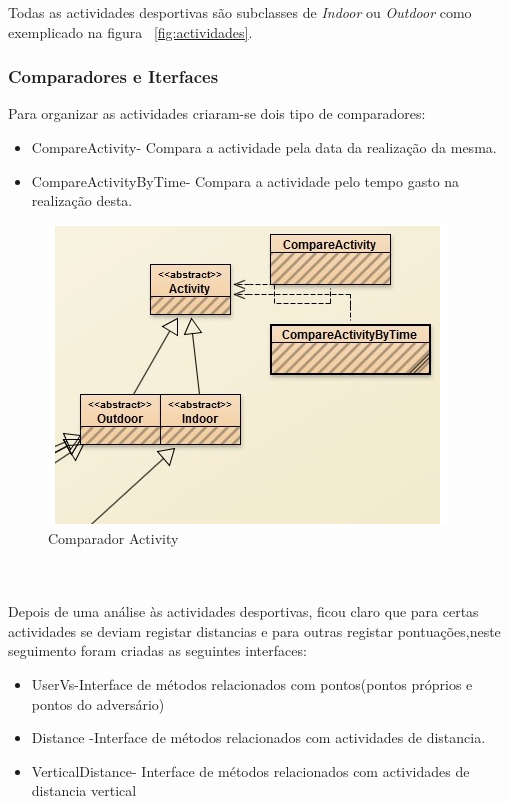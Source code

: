 \documentclass[10pt,notitlepage]{article}
\begin{document}
Todas as actividades desportivas são subclasses de \textit{Indoor} ou \textit{Outdoor} como exemplicado na figura ~\ref{fig:actividades}.
 
\subsubsection{Comparadores e Iterfaces}
Para organizar as actividades criaram-se dois tipo de comparadores:
\begin{itemize}
\item CompareActivity- Compara a actividade pela data da realização da mesma.
\item CompareActivityByTime- Compara a actividade pelo tempo gasto na realização desta.
\end{itemize}

\begin{figure}[ht]
\centering
\includegraphics[scale=1]{ComparadorActivity.png}
\caption{Comparador Activity}
\end{figure}

~\\~\\

Depois de uma análise às actividades desportivas, ficou claro que para certas actividades se deviam registar distancias e para outras registar pontuações,neste seguimento foram criadas as seguintes interfaces:

\begin{figure}

\end{figure}  

\begin{itemize}
\item UserVs-Interface de métodos relacionados com pontos(pontos próprios e pontos do adversário)
\item Distance -Interface de métodos relacionados com actividades de distancia.
\item VerticalDistance- Interface de métodos relacionados com actividades de distancia vertical
\end{itemize}
\end{document}
